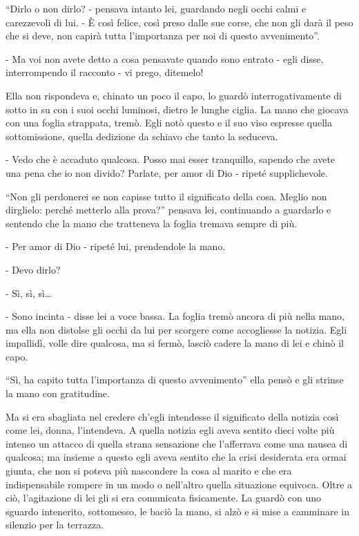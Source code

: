 ``Dirlo o non dirlo? - pensava intanto lei, guardando negli occhi calmi e carezzevoli di lui. - È così felice, così preso dalle sue corse, che non gli darà il peso che si deve, non capirà tutta l'importanza per noi di questo avvenimento''. 

- Ma voi non avete detto a cosa pensavate quando sono entrato - egli disse, interrompendo il racconto - vi prego, ditemelo! 

Ella non rispondeva e, chinato un poco il capo, lo guardò interrogativamente di sotto in su con i suoi occhi luminosi, dietro le lunghe ciglia. La mano che giocava con una foglia strappata, tremò. Egli notò questo e il suo viso espresse quella sottomissione, quella dedizione da schiavo che tanto la seduceva. 

- Vedo che è accaduto qualcosa. Posso mai esser tranquillo, sapendo che avete una pena che io non divido? Parlate, per amor di Dio - ripeté supplichevole. 

``Non gli perdonerei se non capisse tutto il significato della cosa. Meglio non dirglielo: perché metterlo alla prova?'' pensava lei, continuando a guardarlo e sentendo che la mano che tratteneva la foglia tremava sempre di più. 

- Per amor di Dio - ripeté lui, prendendole la mano. 

- Devo dirlo? 

- Sì, sì, sì\ldots{} 

- Sono incinta - disse lei a voce bassa. La foglia tremò ancora di più nella mano, ma ella non distolse gli occhi da lui per scorgere come accogliesse la notizia. Egli impallidì, volle dire qualcosa, ma si fermò, lasciò cadere la mano di lei e chinò il capo. 

``Sì, ha capito tutta l'importanza di questo avvenimento'' ella pensò e gli strinse la mano con gratitudine. 

Ma si era sbagliata nel credere ch'egli intendesse il significato della notizia così come lei, donna, l'intendeva. A quella notizia egli aveva sentito dieci volte più intenso un attacco di quella strana sensazione che l'afferrava come una nausea di qualcosa; ma insieme a questo egli aveva sentito che la crisi desiderata era ormai giunta, che non si poteva più nascondere la cosa al marito e che era indispensabile rompere in un modo o nell'altro quella situazione equivoca. Oltre a ciò, l'agitazione di lei gli si era comunicata fisicamente. La guardò con uno sguardo intenerito, sottomesso, le baciò la mano, si alzò e si mise a camminare in silenzio per la terrazza. 

